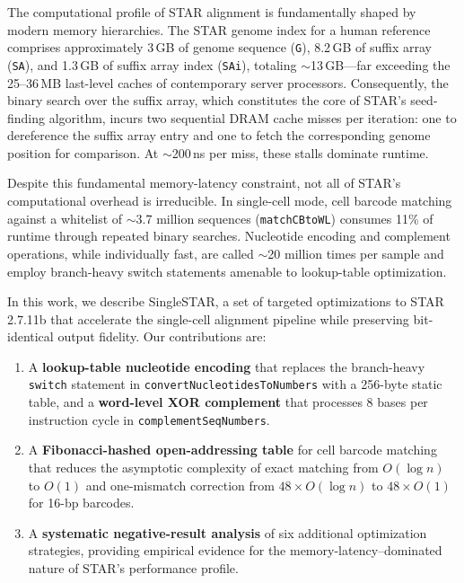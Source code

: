 \documentclass[11pt,twocolumn]{article}
\begin{document}
The computational profile of STAR alignment is fundamentally shaped by modern memory hierarchies. The STAR genome index for a human reference comprises approximately 3\,GB of genome sequence (\texttt{G}), 8.2\,GB of suffix array (\texttt{SA}), and 1.3\,GB of suffix array index (\texttt{SAi}), totaling $\sim$13\,GB---far exceeding the 25--36\,MB last-level caches of contemporary server processors. Consequently, the binary search over the suffix array, which constitutes the core of STAR's seed-finding algorithm, incurs two sequential DRAM cache misses per iteration: one to dereference the suffix array entry and one to fetch the corresponding genome position for comparison. At $\sim$200\,ns per miss, these stalls dominate runtime.

Despite this fundamental memory-latency constraint, not all of STAR's computational overhead is irreducible. In single-cell mode, cell barcode matching against a whitelist of $\sim$3.7 million sequences (\texttt{matchCBtoWL}) consumes 11\% of runtime through repeated binary searches. Nucleotide encoding and complement operations, while individually fast, are called $\sim$20 million times per sample and employ branch-heavy switch statements amenable to lookup-table optimization.

In this work, we describe SingleSTAR, a set of targeted optimizations to STAR 2.7.11b that accelerate the single-cell alignment pipeline while preserving bit-identical output fidelity. Our contributions are:

\begin{enumerate}[leftmargin=*]
  \item A \textbf{lookup-table nucleotide encoding} that replaces the branch-heavy \texttt{switch} statement in \texttt{convertNucleotidesToNumbers} with a 256-byte static table, and a \textbf{word-level XOR complement} that processes 8 bases per instruction cycle in \texttt{complementSeqNumbers}.
  \item A \textbf{Fibonacci-hashed open-addressing table} for cell barcode matching that reduces the asymptotic complexity of exact matching from $O(\log n)$ to $O(1)$ and one-mismatch correction from $48 \times O(\log n)$ to $48 \times O(1)$ for 16-bp barcodes.
  \item A \textbf{systematic negative-result analysis} of six additional optimization strategies, providing empirical evidence for the memory-latency--dominated nature of STAR's performance profile.
\end{enumerate}
\end{document}
